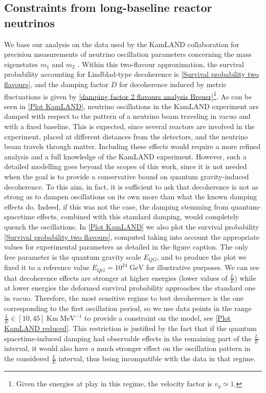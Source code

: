 \documentclass[11pt]{article}
\begin{document}
\subsection{Constraints from long-baseline reactor neutrinos}\label{analysis KAM}

We base our analysis on the data used by the KamLAND collaboration for precision measurements of neutrino oscillation parameters concerning the mass eigenstates $m_1$ and $m_2$ \cite{KamLAND:2008dgz}.
Within this two-flavour approximation, the survival probability accounting for Lindblad-type decoherence is \eqref{Survival probability two flavours}, and the damping factor $D$ for decoherence induced by metric fluctuations \cite{Breuer:2008rh} is given by \eqref{damping factor 2 flavours analysis Breuer}\footnote{Given the energies at play in this regime, the velocity factor is $v_g\simeq1$.}.
As can be seen in \cref{Plot KamLAND}, neutrino oscillations in the KamLAND experiment are damped with respect to the pattern of a neutrino beam traveling in vacuo and with a fixed baseline. This is expected, since several reactors are involved in the experiment, placed at different distances from the detectors, and the neutrino beam travels through matter. Including these effects would require a more refined analysis and a full knowledge of the KamLAND experiment. However, such a detailed modelling goes beyond the scopes of this work, since it is not needed when the goal is to provide a conservative bound on quantum gravity-induced decoherence. To this aim, in fact, it is sufficient to ask that decoherence is not as strong as to dampen oscillations on its own more than what the known damping effects do. Indeed, if this was not the case, the damping stemming from quantum-spacetime effects, combined with this standard damping, would completely quench the oscillations.
In \cref{Plot KamLAND} we also plot the survival probability \eqref{Survival probability two flavours}, computed taking into account the appropriate values for experimental parameters as detailed in the figure caption. The only free parameter is the quantum gravity scale $E_{QG}$, and to produce the plot we fixed it to a reference value $E_{QG} = 10^{24}\;\text{GeV}$ for illustrative purposes. We can see that decoherence effects are stronger at higher energies (lower values of $\frac{L}{E}$) while at lower energies the deformed survival probability approaches the standard one in vacuo. Therefore, the most sensitive regime to test decoherence is the one corresponding to the first oscillation period, so we use data points in the range $\frac{L}{E}\in [10,45]\;\text{Km}\; \text{MeV}^{-1}$ to provide a constraint on the model, see \cref{Plot KamLAND reduced}. This restriction is justified by the fact that if the quantum spacetime-induced damping had observable effects in the remaining part of the $\frac{L}{E}$ interval, it would also have a much stronger effect on the oscillation pattern in the considered $\frac{L}{E}$ interval, thus being incompatible with the data in that regime.
\end{document}
